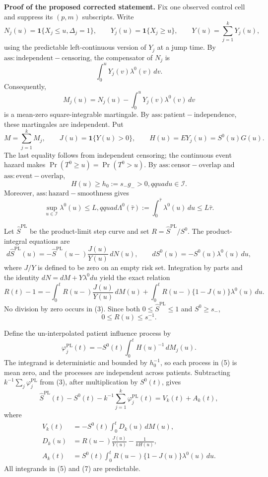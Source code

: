 \textbf{Proof of the proposed corrected statement.}
Fix one observed control cell and suppress its \((p,m)\) subscripts.  Write
\[
 N_j(u)=\mathbf 1\{X_j\le u,\Delta_j=1\},\qquad
 Y_j(u)=\mathbf 1\{X_j\ge u\},\qquad
 Y(u)=\sum_{j=1}^kY_j(u),
\]
using the predictable left-continuous version of \(Y_j\) at a jump time.  By \(\mathrm{ass:independent-censoring}\), the compensator of \(N_j\) is
\[
 \int_0^uY_j(v)\lambda^0(v)\,dv.
\]
Consequently,
\[
 M_j(u)=N_j(u)-\int_0^uY_j(v)\lambda^0(v)\,dv
\]
is a mean-zero square-integrable martingale.  By \(\mathrm{ass:patient-independence}\), these martingales are independent.  Put
\[
 M=\sum_{j=1}^kM_j,\qquad
 J(u)=\mathbf 1\{Y(u)>0\},\qquad
 H(u)=E Y_j(u)=S^0(u)G(u).
\]
The last equality follows from independent censoring; the continuous event hazard makes \(\Pr(T^0\ge u)=\Pr(T^0>u)\).  By \(\mathrm{ass:censor-overlap}\) and \(\mathrm{ass:event-overlap}\),
\[
 H(u)\ge h_0:=s_-g_->0,qquad u\in\mathcal I.                 \tag{1}
\]
Moreover, \(\mathrm{ass:hazard-smoothness}\) gives
\[
 \sup_{u\in\mathcal I}\lambda^0(u)\le L,qquad
 \Lambda^0(\bar\tau):=\int_0^{\bar\tau}\lambda^0(u)\,du
 \le L\bar\tau.                                               \tag{2}
\]

Let \(\widehat S^{\mathrm{PL}}\) be the product-limit step curve and set \(R=\widehat S^{\mathrm{PL}}/S^0\).  The product-integral equations are
\[
 d\widehat S^{\mathrm{PL}}(u)
 =-\widehat S^{\mathrm{PL}}(u-)\frac{J(u)}{Y(u)}\,dN(u),
 \qquad
 dS^0(u)=-S^0(u)\lambda^0(u)\,du,
\]
where \(J/Y\) is defined to be zero on an empty risk set.  Integration by parts and the identity \(dN=dM+Y\lambda^0du\) yield the exact relation
\[
 R(t)-1
 =-\int_0^tR(u-)\frac{J(u)}{Y(u)}\,dM(u)
  +\int_0^tR(u-)\{1-J(u)\}\lambda^0(u)\,du.                 \tag{3}
\]
No division by zero occurs in (3).  Since both \(0\le\widehat S^{\mathrm{PL}}\le1\) and \(S^0\ge s_-\),
\[
 0\le R(u)\le s_-^{-1}.                                      \tag{4}
\]

Define the un-interpolated patient influence process by
\[
 \varphi_j^{\mathrm{PL}}(t)
 =-S^0(t)\int_0^tH(u)^{-1}\,dM_j(u).                         \tag{5}
\]
The integrand is deterministic and bounded by \(h_0^{-1}\), so each process in (5) is mean zero, and the processes are independent across patients.  Subtracting \(k^{-1}\sum_j\varphi_j^{\mathrm{PL}}\) from (3), after multiplication by \(S^0(t)\), gives
\[
 \widehat S^{\mathrm{PL}}(t)-S^0(t)
 -k^{-1}\sum_{j=1}^k\varphi_j^{\mathrm{PL}}(t)
 =V_k(t)+A_k(t),                                               \tag{6}
\]
where
\[
 \begin{aligned}
 V_k(t)&=-S^0(t)\int_0^tD_k(u)\,dM(u),\\
 D_k(u)&=R(u-)\frac{J(u)}{Y(u)}-\frac{1}{kH(u)},\\
 A_k(t)&=S^0(t)\int_0^tR(u-)\{1-J(u)\}\lambda^0(u)\,du.
 \end{aligned}                                                 \tag{7}
\]
All integrands in (5) and (7) are predictable.

